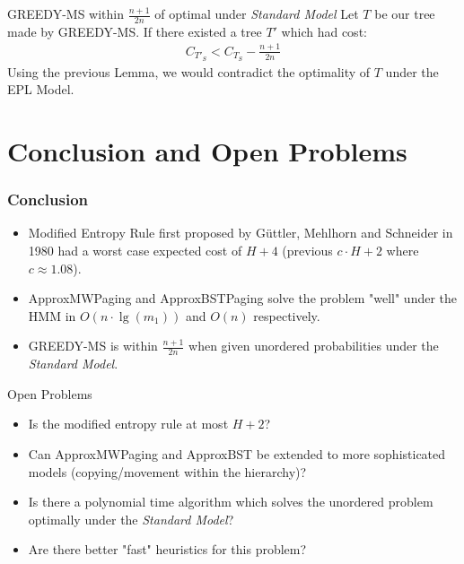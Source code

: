 \documentclass{beamer}
\theoremstyle{plain}
\begin{document}
\begin{frame}{GREEDY-MS within $\frac{n+1}{2n}$ of optimal under \textit{Standard Model}}
Let $T$ be our tree made by GREEDY-MS. If there existed a tree $T'$ which had cost:
\begin{align*}
C_{T'_S} < C_{T_S} - \frac{n+1}{2n}
\end{align*}
Using the previous Lemma, we would contradict the optimality of $T$ under the EPL Model.
\end{frame}





\section{Conclusion and Open Problems} \label{Conclusion and Open Problems}

\begin{frame} \frametitle{Conclusion}
\begin{itemize}
\item Modified Entropy Rule first proposed by  G{\"u}ttler, Mehlhorn and Schneider in 1980 had a worst case expected cost of $H+4$ (previous $c\cdot H+2$ where $c \approx 1.08$).

\item ApproxMWPaging and ApproxBSTPaging solve the problem "well" under the HMM in $O(n\cdot \lg(m_1))$ and $O(n)$ respectively.

\item GREEDY-MS is within $\frac{n+1}{2n}$ when given unordered probabilities under the \textit{Standard Model}.   
\end{itemize}

\end{frame}


\begin{frame}{Open Problems}
\begin{itemize}
\item Is the modified entropy rule at most $H+2$?
\item Can ApproxMWPaging and ApproxBST be extended to more sophisticated models (copying/movement within the hierarchy)?
\item Is there a polynomial time algorithm which solves the unordered problem optimally under the \textit{Standard Model}?
\item Are there better "fast" heuristics for this problem?
\end{itemize}
\end{frame}




\end{document}
